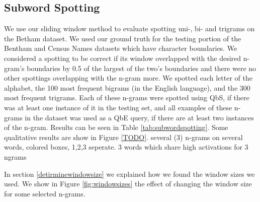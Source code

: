 \documentclass[ms,electronic,twosidetoc,letterpaper,chaptercenter,parttop,lol,lof,lot]{byumsphd}
\begin{document}
\subsection{Subword Spotting}

We use our sliding window method to evaluate spotting uni-, bi- and trigrams on the Betham dataset. We used our ground truth for the testing portion of the Bentham and Census Names datasets which have character boundaries. We considered a spotting to be correct if its window overlapped with the desired n-gram's boundaries by 0.5 of the largest of the two's boundaries and there were no other spottings overlapping with the n-gram more. 
We spotted each letter of the alphabet, the 100 most frequent bigrams (in the English language), and the 300 most frequent trigrams. Each of these n-grams were spotted using QbS, if there was at least one instance of it in the testing set, and all examples of these n-grams in the dataset was used as a QbE query, if there are at least two instances of the n-gram.
Results can be seen in Table \ref{tab:subwordspotting}.
Some qualitative results are show in Figure \ref{TODO}. several (3) n-grams on several words, colored boxes, 1,2,3 seperate. 3 words which share high activations for 3 ngrams

In section \ref{detirminewindowsize} we explained how we found the window sizes we used. We show in Figure \ref{fig:windowsizes} the effect of changing the window size for some selected n-grams.



\end{document}
